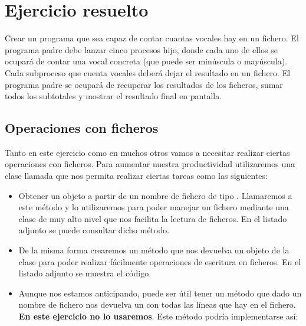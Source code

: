 \documentclass[a4paper,12pt,spanish]{sphinxmanual}
\begin{document}
\section{Ejercicio resuelto}
\label{textos/tema1:ejercicio-resuelto}
Crear un programa que sea capaz de contar cuantas vocales hay en un fichero. El programa padre debe lanzar cinco procesos hijo, donde cada uno de ellos se ocupará de contar una vocal concreta (que puede ser minúscula o mayúscula). Cada subproceso que cuenta vocales deberá dejar el resultado en un fichero. El programa padre se ocupará de recuperar los resultados de los ficheros, sumar todos los subtotales y mostrar el resultado final en pantalla.


\subsection{Operaciones con ficheros}
\label{textos/tema1:operaciones-con-ficheros}
Tanto en este ejercicio como en muchos otros vamos a necesitar realizar ciertas operaciones con ficheros. Para aumentar nuestra productividad utilizaremos una clase llamada  que nos permita realizar ciertas tareas como las siguientes:
\begin{itemize}
\item {} 
Obtener un objeto  a partir de un nombre de fichero de tipo . Llamaremos a este método  y lo utilizaremos para poder manejar un fichero mediante una clase de muy alto nivel que nos facilita la lectura de ficheros. En el listado adjunto se puede consultar dicho método.

\end{itemize}
\begin{itemize}
\item {} 
De la misma forma crearemos un método  que nos devuelva un objeto de la clase  para poder realizar fácilmente operaciones de escritura en ficheros. En el listado adjunto se muestra el código.

\end{itemize}
\begin{itemize}
\item {} 
Aunque nos estamos anticipando, puede ser útil tener un método que dado un nombre de fichero nos devuelva un  con todas las líneas que hay en el fichero. \textbf{En este ejercicio no lo usaremos}. Este método podría implementarse así:

\end{itemize}
\end{document}
